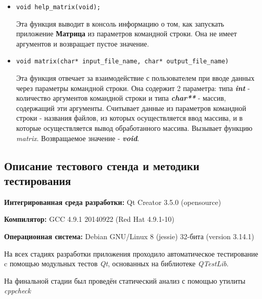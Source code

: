 \documentclass[12pt,a4paper]{report}
\begin{document}
\begin{enumerate}
\begin{itemize}
\item \verb-void help_matrix(void);-

Эта функция выводит в консоль информацию о том, как запускать приложение \textbf{Матрица} из параметров командной строки. Она не имеет аргументов и возвращает пустое значение. 
\end{itemize}

\begin{itemize}
\item \verb-void matrix(char* input_file_name, char* output_file_name)-

Эта функция отвечает за взаимодействие с пользователем при вводе данных через параметры командной строки. Она содержит 2 параметра: типа \textbf{\textit{int}} - количество аргументов командной строки и типа \textbf{\textit{char**}} - массив, содержащий эти аргументы. Считывает данные из параметров командной строки - названия файлов, из которых осуществляется ввод массива, и в которые осуществляется вывод обработанного массива. Вызывает функцию \textit{matrix}. Возвращаемое значение - \textit{\textbf{void}}.
\end{itemize}
\end{enumerate}
\subsection{Описание тестового стенда и методики тестирования}

\begin{flushleft}
\textbf{Интегрированная среда разработки:} Qt Creator 3.5.0 (opensource)

\textbf{Компилятор:} GCC 4.9.1 20140922 (Red Hat 4.9.1-10)

\textbf{Операционная система:} Debian GNU/Linux 8 (jessie) 32-бита (version 3.14.1)
\end{flushleft}

На всех стадиях разработки приложения проходило автоматическое тестирование c помощью модульных тестов \textit{Qt}, основанных на библиотеке  \textit{QTestLib}.

На финальной стадии был проведён статический анализ с помощью утилиты \textit{cppcheck}%
\end{document}
